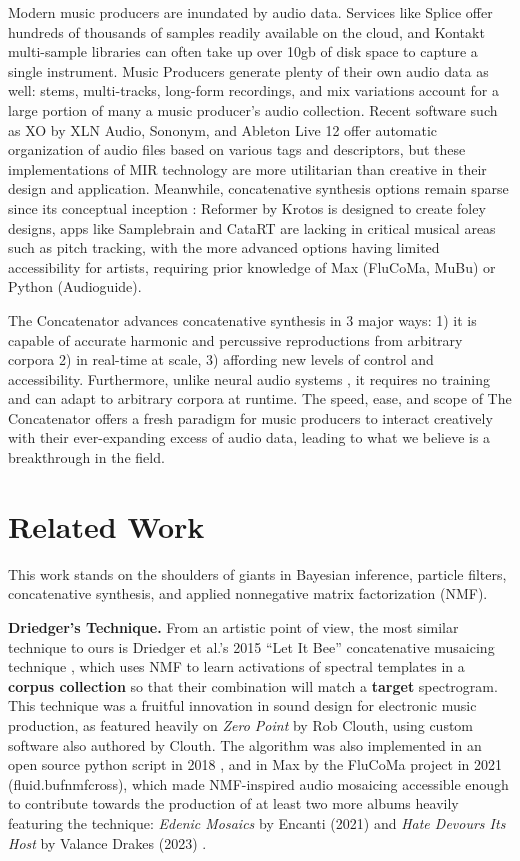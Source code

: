 \documentclass{article}
\begin{document}
Modern music producers are inundated by audio data. Services like Splice offer hundreds of thousands of samples readily available on the cloud, and Kontakt multi-sample libraries can often take up over 10gb of disk space to capture a single instrument. Music Producers generate plenty of their own audio data as well: stems, multi-tracks, long-form recordings, and mix variations account for a large portion of many a music producer's audio collection. Recent software such as XO by XLN Audio, Sononym, and Ableton Live 12 offer automatic organization of audio files based on various tags and descriptors, but these implementations of MIR technology are more utilitarian than creative in their design and application. Meanwhile, concatenative synthesis options remain sparse since its conceptual inception \cite{schwarz2000system}: Reformer by Krotos is designed to create foley designs, apps like Samplebrain and CataRT \cite{schwarz2006real, schwarz2008principles} are lacking in critical musical areas such as pitch tracking, with the more advanced options having limited accessibility for artists, requiring prior knowledge of Max (FluCoMa, MuBu) or Python (Audioguide).

The Concatenator advances concatenative synthesis in 3 major ways: 1) it is capable of accurate harmonic and percussive reproductions from arbitrary corpora 2) in real-time at scale, 3) affording new levels of control and accessibility.  Furthermore, unlike neural audio systems \cite{bitton2020neural}, it requires no training and can adapt to arbitrary corpora at runtime. The speed, ease, and scope of The Concatenator offers a fresh paradigm for music producers to interact creatively with their ever-expanding excess of audio data, leading to what we believe is a breakthrough in the field.

\section{Related Work}
\label{sec:relatedwork}
This work stands on the shoulders of giants in Bayesian inference, particle filters, concatenative synthesis, and applied nonnegative matrix factorization (NMF).

\textbf{Driedger's Technique.} From an artistic point of view, the most similar technique to ours is Driedger et al.'s 2015 ``Let It Bee'' concatenative musaicing technique \cite{driedger2015let}, which uses NMF to learn activations of spectral templates in a \textbf{corpus collection} so that their combination will match a \textbf{target} spectrogram. This technique was a fruitful innovation in sound design for electronic music production, as featured heavily on {\em Zero Point} by Rob Clouth\cite{clouth2020}, using custom software also authored by Clouth. The algorithm was also implemented in an open source python script in 2018 \cite{tralie2018}, and in Max by the FluCoMa project in 2021 (fluid.bufnmfcross)\cite{flucoma2021}, which made NMF-inspired audio mosaicing accessible enough to contribute towards the production of at least two more albums heavily featuring the technique: {\em Edenic Mosaics} by Encanti (2021) \cite{cantil2021} and {\em Hate Devours Its Host} by Valance Drakes (2023) \cite{drakes2023}.
\end{document}
